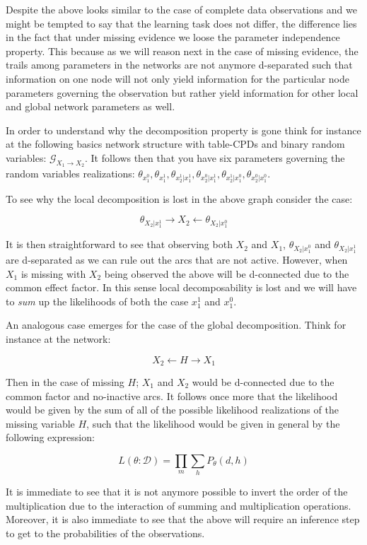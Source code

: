 \documentclass[11pt]{article}
\begin{document}
\begin{article}
Despite the above looks similar to the case of complete data
observations and we might be tempted to say that the learning task
does not differ, the difference lies in the fact that under missing
evidence we loose the parameter independence property. This because
as we will reason next in the case of missing evidence, the trails
among parameters in the networks are not anymore d-separated such
that information on one node will not only yield information for
the particular node parameters governing the observation but rather
yield information for other local and global network parameters as well.

In order to understand why the decomposition property is gone think
for instance at the following basics network structure with
table-CPDs and binary random variables: \(\mathscr{G}_{X_1
   \rightarrow X_2}\). It follows then that you have six parameters
governing the random variables realizations: \(\theta_{x_1^0},
   \theta_{x_1^1}, \theta_{x_2^1| x_1^1}, \theta_{x_2^0 | x_1^1},
   \theta_{x_2^1 | x_1^0}, \theta_{x_2^0 | x_1^0}\).

To see why the local decomposition is lost in the above graph
consider the case:

$$\theta_{X_2 | x_1^1} \rightarrow X_2 \leftarrow \theta_{X_2 |
   x_1^0}$$

It is then straightforward to see that observing both \(X_2\) and
\(X_1\), \(\theta_{X_2 | x_1^0}\) and \(\theta_{X_2 | x_1^1}\) are
d-separated as we can rule out the arcs that are not
active. However, when \(X_1\) is missing with \(X_2\) being observed
the above will be d-connected due to the common effect factor. In
this sense local decomposability is lost and we will have to \emph{sum}
up the likelihoods of both the case \(x_1^1\) and \(x_1^0\).

An analogous case emerges for the case of the global
decomposition. Think for instance at the network:

$$ X_2 \leftarrow  H \rightarrow X_1 $$

Then in the case of missing \(H\); \(X_1\) and \(X_2\) would be
d-connected due to the common factor and no-inactive arcs. It
follows once more that the likelihood would be given by the sum of
all of the possible likelihood realizations of the missing variable
\(H\), such that the likelihood would be given in general by the
following expression:

$$ L(\theta: \mathscr{D}) = \prod_m \sum_h P_\theta(d, h)$$

It is immediate to see that it is not anymore possible to invert
the order of the multiplication due to the interaction of summing
and multiplication operations. Moreover, it is also immediate to
see that the above will require an inference step to get to the
probabilities of the observations.


\end{article}
\end{document}
